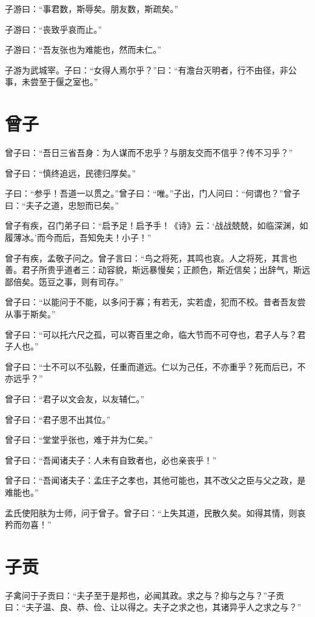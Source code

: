 \documentclass[a5paper]{ctexbook}
\begin{document}
    子游曰：“事君数，斯辱矣。朋友数，斯疏矣。”

    子游曰：“丧致乎哀而止。”
    
    子游曰：“吾友张也为难能也，然而未仁。”

    子游为武城宰。子曰：“女得人焉尔乎？”曰：“有澹台灭明者，行不由径，非公事，未尝至于偃之室也。”

    \chapter{曾子}

    曾子曰：“吾日三省吾身：为人谋而不忠乎？与朋友交而不信乎？传不习乎？”

    曾子曰：“慎终追远，民德归厚矣。”

    子曰：“参乎！吾道一以贯之。”曾子曰：“唯。”子出，门人问曰：“何谓也？”曾子曰：“夫子之道，忠恕而已矣。”

    曾子有疾，召门弟子曰：“启予足！启予手！《诗》云：‘战战兢兢，如临深渊，如履薄冰。’而今而后，吾知免夫！小子！”

    曾子有疾，孟敬子问之。曾子言曰：“鸟之将死，其鸣也哀。人之将死，其言也善。君子所贵乎道者三：动容貌，斯远暴慢矣；正颜色，斯近信矣；出辞气，斯远鄙倍矣。笾豆之事，则有司存。”

    曾子曰：“以能问于不能，以多问于寡；有若无，实若虚，犯而不校。昔者吾友尝从事于斯矣。”
    
    曾子曰：“可以托六尺之孤，可以寄百里之命，临大节而不可夺也，君子人与？君子人也。”
    
    曾子曰：“士不可以不弘毅，任重而道远。仁以为己任，不亦重乎？死而后已，不亦远乎？”

    曾子曰：“君子以文会友，以友辅仁。”
    
    曾子曰：“君子思不出其位。”

    曾子曰：“堂堂乎张也，难于并为仁矣。”
    
    曾子曰：“吾闻诸夫子：人未有自致者也，必也亲丧乎！”
    
    曾子曰：“吾闻诸夫子：孟庄子之孝也，其他可能也，其不改父之臣与父之政，是难能也。”

    孟氏使阳肤为士师，问于曾子。曾子曰：“上失其道，民散久矣。如得其情，则哀矜而勿喜！”

    \chapter{子贡}

    子禽问于子贡曰：“夫子至于是邦也，必闻其政。求之与？抑与之与？”子贡曰：“夫子温、良、恭、俭、让以得之。夫子之求之也，其诸异乎人之求之与？”
\end{document}
